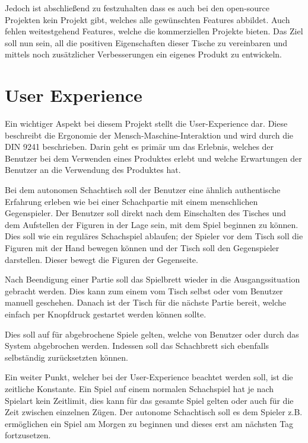 Jedoch ist abschließend zu festzuhalten dass es auch bei den open-source
Projekten kein Projekt gibt, welches alle gewünschten Features abbildet.
Auch fehlen weitestgehend Features, welche die kommerziellen Projekte
bieten. Das Ziel soll nun sein, all die positiven Eigenschaften dieser
Tische zu vereinbaren und mittels noch zusätzlicher Verbesserungen ein
eigenes Produkt zu entwickeln.

\hypertarget{user-experience}{%
\section{User Experience}\label{user-experience}}

Ein wichtiger Aspekt bei diesem Projekt stellt die User-Experience dar.
Diese beschreibt die Ergonomie der Mensch-Maschine-Interaktion und wird
durch die DIN 9241\cite{din9241} beschrieben. Darin geht es primär
um das Erlebnis, welches der Benutzer bei dem Verwenden eines Produktes
erlebt und welche Erwartungen der Benutzer an die Verwendung des
Produktes hat.

Bei dem autonomen Schachtisch soll der Benutzer eine ähnlich
authentische Erfahrung erleben wie bei einer Schachpartie mit einem
menschlichen Gegenspieler. Der Benutzer soll direkt nach dem Einschalten
des Tisches und dem Aufstellen der Figuren in der Lage sein, mit dem
Spiel beginnen zu können. Dies soll wie ein reguläres Schachspiel
ablaufen; der Spieler vor dem Tisch soll die Figuren mit der Hand
bewegen können und der Tisch soll den Gegenspieler darstellen. Dieser
bewegt die Figuren der Gegenseite.

Nach Beendigung einer Partie soll das Spielbrett wieder in die
Ausgangssituation gebracht werden. Dies kann zum einem vom Tisch selbst
oder vom Benutzer manuell geschehen. Danach ist der Tisch für die
nächste Partie bereit, welche einfach per Knopfdruck gestartet werden
können sollte.

Dies soll auf für abgebrochene Spiele gelten, welche von Benutzer oder
durch das System abgebrochen werden. Indessen soll das Schachbrett sich
ebenfalls selbständig zurücksetzten können.

Ein weiter Punkt, welcher bei der User-Experience beachtet werden soll,
ist die zeitliche Konstante. Ein Spiel auf einem normalen Schachspiel
hat je nach Spielart kein Zeitlimit, dies kann für das gesamte Spiel
gelten oder auch für die Zeit zwischen einzelnen Zügen. Der autonome
Schachtisch soll es dem Spieler z.B. ermöglichen ein Spiel am Morgen zu
beginnen und dieses erst am nächsten Tag fortzusetzen.

